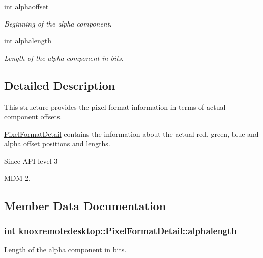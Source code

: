 \begin{DoxyCompactItemize}
int \hyperlink{structknoxremotedesktop_1_1PixelFormatDetail_a4cfaeee3077ff3609b0d7a5aab4e5a83}{alphaoffset}
\begin{DoxyCompactList}\small\item\em \-Beginning of the alpha component. \end{DoxyCompactList}\item 
int \hyperlink{structknoxremotedesktop_1_1PixelFormatDetail_a2e62bca1625dfeefebd537dd0678627d}{alphalength}
\begin{DoxyCompactList}\small\item\em \-Length of the alpha component in bits. \end{DoxyCompactList}\end{DoxyCompactItemize}


\subsection{\-Detailed \-Description}
\-This structure provides the pixel format information in terms of actual component offsets. 

\hyperlink{structknoxremotedesktop_1_1PixelFormatDetail}{\-Pixel\-Format\-Detail} contains the information about the actual red, green, blue and alpha offset positions and lengths.

\begin{DoxySince}{\-Since}
\-A\-P\-I level 3 

\-M\-D\-M 2. 
\end{DoxySince}


\subsection{\-Member \-Data \-Documentation}
\hypertarget{structknoxremotedesktop_1_1PixelFormatDetail_a2e62bca1625dfeefebd537dd0678627d}{
\subsubsection[{alphalength}]{\setlength{\rightskip}{0pt plus 5cm}int {\bf knoxremotedesktop\-::\-Pixel\-Format\-Detail\-::alphalength}}}\label{structknoxremotedesktop_1_1PixelFormatDetail_a2e62bca1625dfeefebd537dd0678627d}


\-Length of the alpha component in bits. 

